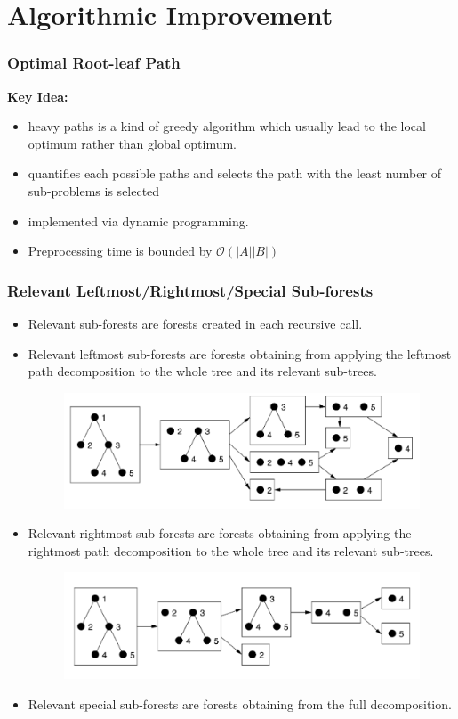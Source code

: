 \documentclass{beamer}
\begin{document}
\section{Algorithmic Improvement}
\begin{frame}
\frametitle{Optimal Root-leaf Path}
\textbf{Key Idea:}
\begin{itemize}
\item heavy paths is a kind of greedy algorithm which usually lead to the local optimum rather than global optimum.
\item quantifies each possible paths and selects the path with the least number of sub-problems is selected
\item implemented via dynamic programming.
\item Preprocessing time  is bounded by $\mathcal{O}(\left\vert A \right\vert \left\vert B \right\vert)$
\end{itemize}
\end{frame}
\begin{frame}
\frametitle{Relevant Leftmost/Rightmost/Special Sub-forests}
\begin{itemize}
\item Relevant sub-forests are forests created in each recursive call.
\item Relevant leftmost sub-forests are forests obtaining from applying the leftmost path decomposition to the whole tree and its relevant sub-trees.
\begin{figure}
	\includegraphics[width=0.5\linewidth]{LeftmostPathDecomposition}
	\centering
\end{figure}
\item Relevant rightmost sub-forests are forests obtaining from applying the rightmost path decomposition to the whole tree and its relevant sub-trees.
\begin{figure}
	\includegraphics[width=0.5\linewidth]{RightmostPathDecomposition}
	\centering
\end{figure}
\item Relevant special sub-forests are forests obtaining from the full decomposition.
\end{itemize}
\end{frame}
\end{document}
